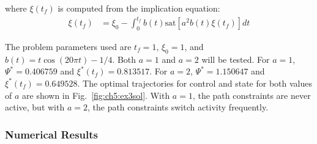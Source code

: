 \noindent where $\xi(t_f)$ is computed from the implication equation:
\begin{align}
\xi(t_f) &= \xi_0 - \int_0^{t_f} b(t) \mathrm{sat}\left[ a^2 b(t) \xi(t_f) \right] dt 
\end{align}

\noindent The problem parameters used are $t_f = 1$, $\xi_0 = 1$, and $b(t) = t \cos(20 \pi t) - 1/4$.
Both $a = 1$ and $a = 2$ will be tested.
For $a=1$, $\Psi^* = 0.406759$ and $\xi^*(t_f) = 0.813517$.
For $a=2$, $\Psi^* = 1.150647$ and $\xi^*(t_f) = 0.649528$.
The optimal trajectories for control and state for both values of $a$ are shown in Fig.~\ref{fig:ch5:ex3sol}.
With $a=1$, the path constraints are never active, but with $a=2$, the path constraints switch activity frequently. 

\subsubsection{Numerical Results}


